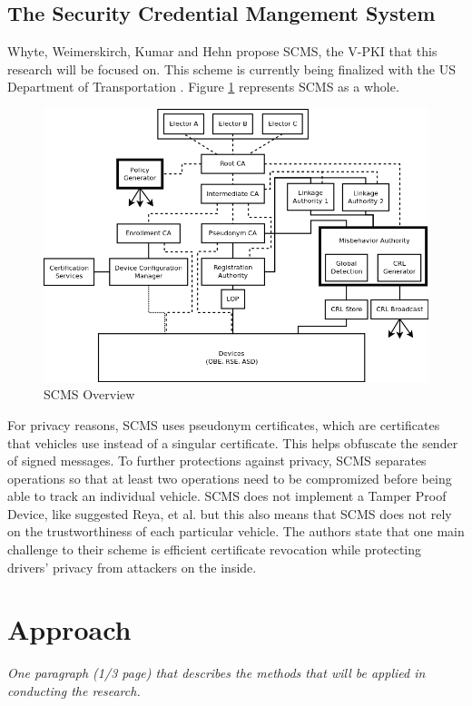 \documentclass {article}
\newcommand{\sechint}[1]{\small{\emph{#1}} \bigskip}
\begin{document}
\subsection{The Security Credential Mangement System}
Whyte, Weimerskirch, Kumar and Hehn propose SCMS, the V-PKI that this research will be focused on. This scheme is currently being finalized with the US Department of Transportation \autocite{SecCredMgr}. Figure \ref{scms_overview} represents SCMS as a whole. 
\begin{figure}[!hb]
	\centering
	\includegraphics[width=.8\textwidth]{images/scms_diagram.png}
	\caption{SCMS Overview}
	\label{scms_overview}
\end{figure}
For privacy reasons, SCMS uses pseudonym certificates, which are certificates that vehicles use instead of a singular certificate. This helps obfuscate the sender of signed messages. To further protections against privacy, SCMS separates operations so that at least two operations need to be compromized before being able to track an individual vehicle. SCMS does not implement a Tamper Proof Device, like suggested Reya, et al. but this also means that SCMS does not rely on the trustworthiness of each particular vehicle. The authors state that one main challenge to their scheme is efficient certificate revocation while protecting drivers' privacy from attackers on the inside.

\section{Approach}{\sechint{One paragraph (1/3 page) that describes the methods that will be applied in conducting the research.}}
\end{document}
